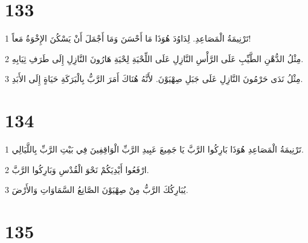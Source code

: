 \chapter{133}

\par 1 تَرْنِيمَةُ الْمَصَاعِدِ. لِدَاوُدَ هُوَذَا مَا أَحْسَنَ وَمَا أَجْمَلَ أَنْ يَسْكُنَ الإِخْوَةُ مَعاً!
\par 2 مِثْلُ الدُّهْنِ الطَّيِّبِ عَلَى الرَّأْسِ النَّازِلِ عَلَى اللِّحْيَةِ لِحْيَةِ هَارُونَ النَّازِلِ إِلَى طَرَفِ ثِيَابِهِ.
\par 3 مِثْلُ نَدَى حَرْمُونَ النَّازِلِ عَلَى جَبَلِ صِهْيَوْنَ. لأَنَّهُ هُنَاكَ أَمَرَ الرَّبُّ بِالْبَرَكَةِ حَيَاةٍ إِلَى الأَبَدِ.

\chapter{134}

\par 1 تَرْنِيمَةُ الْمَصَاعِدِ هُوَذَا بَارِكُوا الرَّبَّ يَا جَمِيعَ عَبِيدِ الرَّبِّ الْوَاقِفِينَ فِي بَيْتِ الرَّبِّ بِاللَّيَالِي.
\par 2 ارْفَعُوا أَيْدِيَكُمْ نَحْوَ الْقُدْسِ وَبَارِكُوا الرَّبَّ.
\par 3 يُبَارِكُكَ الرَّبُّ مِنْ صِهْيَوْنَ الصَّانِعُ السَّمَاوَاتِ وَالأَرْضَ.

\chapter{135}

